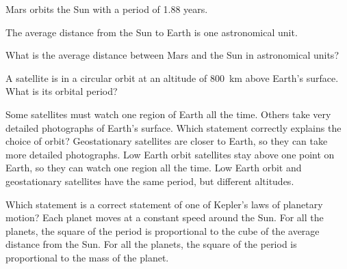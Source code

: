 \begin{quizq}{}
Mars orbits the Sun with a period of 1.88 years.

The average distance from the Sun to Earth is one astronomical unit.

What is the average distance between Mars and the Sun in astronomical units?
\end{quizq}

\begin{quizq}{}
A satellite is in a circular orbit at an altitude of \qty{800}{km} above Earth's surface. What is
its orbital period?
\end{quizq}

\begin{quizq}{}
Some satellites must watch one region of Earth all the time. Others take very detailed photographs
of Earth's surface. Which statement correctly explains the choice of orbit?
  {Geostationary satellites are closer to Earth, so they can take more detailed photographs.}
  {Low Earth orbit satellites stay above one point on Earth, so they can watch one region all the
   time.}
  {Low Earth orbit and geostationary satellites have the same period, but different altitudes.}
\end{quizq}

\begin{quizq}{}
Which statement is a correct statement of one of Kepler's laws of planetary motion?
  {Each planet moves at a constant speed around the Sun.}
  {For all the planets, the square of the period is proportional to the cube of the average
   distance from the Sun.}
  {For all the planets, the square of the period is proportional to the mass of the planet.}
\end{quizq}

